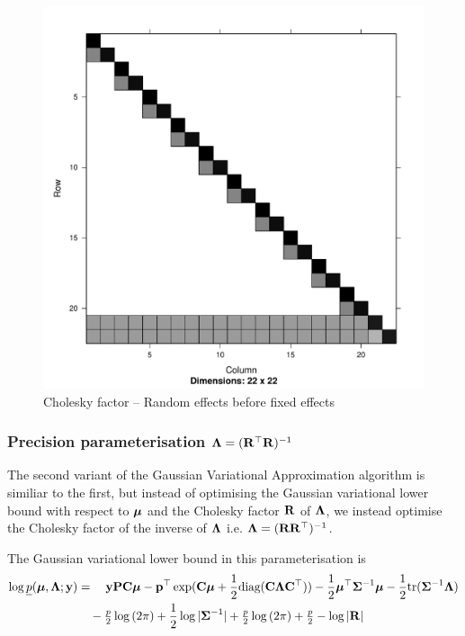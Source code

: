 	\begin{figure}[p]
		\includegraphics[scale=.25]{mZ_mX_cholesky.pdf}
		\caption{\tiny Cholesky factor -- Random effects before fixed effects}
		\label{fig:cholrandomfixed}
	\end{figure}
		
	\subsubsection{Precision parameterisation ${\boldsymbol \Lambda} = ({\bf R}^\top {\bf R})^{-1}$}
			
	\noindent The second variant of the Gaussian Variational Approximation algorithm is similiar to the first, but
	instead of optimising the Gaussian variational lower bound with respect to ${\boldsymbol \mu}$ and the Cholesky factor
	${\bf R}$ of ${\boldsymbol \Lambda}$, we instead optimise the Cholesky factor of the inverse of ${\boldsymbol \Lambda}$ i.e. ${\boldsymbol \Lambda} =
	({\bf R} {\bf R}^\top)^{-1}$.
	
	The Gaussian variational lower bound in this parameterisation is
	\begin{align*}
		\log \underline{p}({\boldsymbol \mu}, {\boldsymbol \Lambda}; {\bf y}) & = \quad {\bf y}{\bf P}{\bf C} {\boldsymbol\mu} - {\bf p}^\top \exp({\bf C} {\boldsymbol \mu} + \frac{1}{2} \text{diag}({\bf C} {\boldsymbol \Lambda} {\bf C}^\top)) - \frac{1}{2} {\boldsymbol \mu}^\top {\boldsymbol\Sigma}^{-1} {\boldsymbol \mu} - \frac{1}{2} \text{tr}{({\boldsymbol\Sigma}^{-1} {\boldsymbol\Lambda})} \\
		                                        & \quad- \tfrac{p}{2} \log{(2 \pi)} + \frac{1}{2} \log{|{\boldsymbol\Sigma}^{-1}|} + \tfrac{p}{2} \log{(2 \pi)} + \tfrac{p}{2} - \log{|{\bf R}|}                                             
	\end{align*}
			
